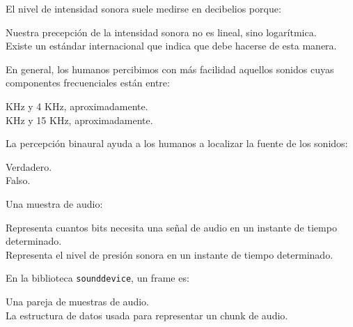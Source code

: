 \documentclass[legalpaper, 12pt, addpoints]{exam}
\begin{document}
\begin{questions}
\vspace{0.10in}

\question El nivel de intensidad sonora suele medirse en decibelios porque:

\begin{oneparchoices}
  \choice Nuestra precepción de la intensidad sonora no es lineal, sino logarítmica.\\
  \choice Existe un estándar internacional que indica que debe hacerse de esta manera.
\end{oneparchoices}
  
\vspace{0.10in}

\question En general, los humanos percibimos con más facilidad
aquellos sonidos cuyas componentes frecuenciales están entre:

\begin{oneparchoices}
   KHz y 4 KHz, aproximadamente.\\
   KHz y 15 KHz, aproximadamente.
\end{oneparchoices}
  
\vspace{0.10in}

\question La percepción binaural ayuda a los humanos a localizar la fuente de los sonidos:

\begin{oneparchoices}
  \choice Verdadero.\\
  \choice Falso.
\end{oneparchoices}
  
\vspace{0.10in}

\question Una muestra de audio:

\begin{oneparchoices}
  \choice Representa cuantos bits necesita una señal de audio en un instante de tiempo determinado.\\
  \choice Representa el nivel de presión sonora en un instante de tiempo determinado.
\end{oneparchoices}
  
\vspace{0.10in}

\question En la biblioteca \texttt{sounddevice}, un frame es:

\begin{oneparchoices}
  \choice Una pareja de muestras de audio.\\
  \choice La estructura de datos usada para representar un chunk de audio.
\end{oneparchoices}
  

\end{questions}
\end{document}
